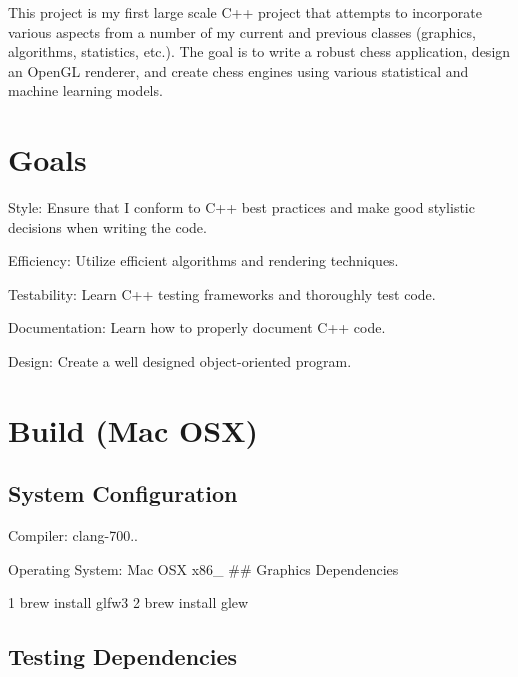 This project is my first large scale C++ project that attempts to incorporate various aspects from a number of my current and previous classes (graphics, algorithms, statistics, etc.). The goal is to write a robust chess application, design an Open\+GL renderer, and create chess engines using various statistical and machine learning models.

\section*{Goals}


\begin{DoxyItemize}
\item Style\+: Ensure that I conform to C++ best practices and make good stylistic decisions when writing the code.
\item Efficiency\+: Utilize efficient algorithms and rendering techniques.
\item Testability\+: Learn C++ testing frameworks and thoroughly test code.
\item Documentation\+: Learn how to properly document C++ code.
\item Design\+: Create a well designed object-\/oriented program.
\end{DoxyItemize}

\section*{Build (Mac O\+SX)}

\subsection*{System Configuration}


\begin{DoxyItemize}
\item Compiler\+: clang-\/700..
\item Operating System\+: Mac O\+SX x86\+\_ \#\# Graphics Dependencies 
\begin{DoxyCode}
1 brew install glfw3
2 brew install glew
\end{DoxyCode}

\end{DoxyItemize}

\subsection*{Testing Dependencies}

